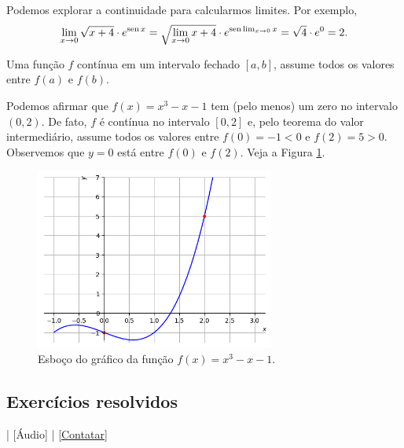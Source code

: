\begin{ex}
  Podemos explorar a continuidade para calcularmos limites. Por exemplo,
  \begin{equation}
    \lim_{x\to 0} \sqrt{x+4}\cdot e^{\operatorname{sen} x} = \sqrt{\lim_{x\to 0} x+4}\cdot e^{\operatorname{sen} \lim_{x\to 0} x} = \sqrt{4}\cdot e^{0} = 2.
  \end{equation}
\end{ex}

\begin{teo}\label{teo:valorintermediario}
  Uma função $f$ contínua em um intervalo fechado $[a, b]$, assume todos os valores entre $f(a)$ e $f(b)$.
\end{teo}

\begin{ex}
  Podemos afirmar que $f(x)=x^3-x-1$ tem (pelo menos) um zero no intervalo $(0, 2)$. De fato, $f$ é contínua no intervalo $[0,2]$ e, pelo teorema do valor intermediário, assume todos os valores entre $f(0)=-1<0$ e $f(2)=5>0$. Observemos que $y = 0$ está entre $f(0)$ e $f(2)$. Veja a Figura \ref{fig:cap_lim_ex_teoint}.

  \begin{figure}[H]
    \centering
    \includegraphics[width=0.7\textwidth]{./cap_lim/dados/fig_cap_lim_ex_teoint/fig_cap_lim_ex_teoint}
    \caption{Esboço do gráfico da função $f(x) = x^3-x-1$.}
    \label{fig:cap_lim_ex_teoint}
  \end{figure}
\end{ex}

\subsection*{Exercícios resolvidos}

\begin{flushright}
  [Vídeo] | [Áudio] | \href{https://phkonzen.github.io/notas/contato.html}{[Contatar]}
\end{flushright}

